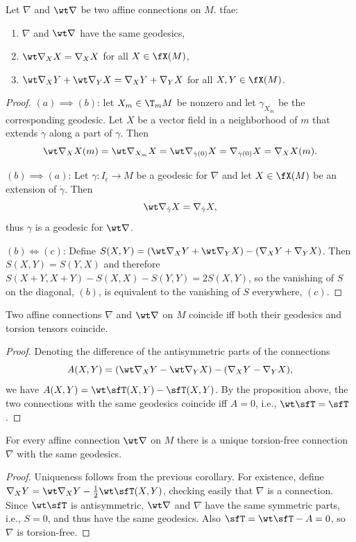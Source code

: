 \begin{prop}\label{prop geodesics coincide}
    Let $\nabla$ and $\wt\nabla$ be two affine connections on $M$. \gls{tfae}:
    \begin{enumerate}[label=(\alph*)]
        \item $\nabla$ and $\wt\nabla$ have the same geodesics,
        \item $\wt\nabla_X X=\nabla_X X$ for all $X\in\fX(M)$,
        \item $\wt\nabla_X Y+\wt\nabla_Y X=\nabla_X Y+\nabla_Y X$ for all $X,Y\in\fX(M)$.
    \end{enumerate}
\end{prop}
\begin{proof}
    $(a)\implies(b)$: let $X_m\in \T_mM$ be nonzero and let $\gamma_{X_m}$ be the corresponding geodesic. Let $X$ be a vector field in a neighborhood of $m$ that extends $\dot\gamma$ along a part of $\gamma$. Then 
    \[\wt\nabla_{X} X(m)=\wt\nabla_{X_m} X=\wt\nabla_{\dot\gamma(0)}X=\nabla_{\dot\gamma(0)}X=\nabla_X X(m).\]


    $(b)\implies(a)$: Let $\gamma:I_\epsilon\to M$ be a geodesic for $\nabla$ and let $X\in\fX(M)$ be an extension of $\dot\gamma$. Then 
    \[\wt\nabla_{\dot\gamma} X=\nabla_{\dot\gamma}X,\]
    thus $\gamma$ is a geodesic for $\wt\nabla$.

    $(b)\Leftrightarrow(c)$: Define $S(X,Y)=(\wt\nabla_X Y+\wt\nabla_Y X)-(\nabla_X Y+\nabla_Y X)$. Then $S(X,Y)=S(Y,X)$ and therefore $S(X+Y,X+Y)-S(X,X)-S(Y,Y)=2S(X,Y)$, so the vanishing of $S$ on the diagonal, $(b)$, is equivalent to the vanishing of $S$ everywhere, $(c)$.
\end{proof}
\begin{cor}
    Two affine connections $\nabla$ and $\wt\nabla$ on $M$ coincide iff both their geodesics and torsion tensors coincide.
\end{cor}
\begin{proof}
    Denoting the difference of the antisymmetric parts of the connections 
    \[A(X,Y)=(\wt\nabla_X Y-\wt\nabla_Y X)-(\nabla_X Y-\nabla_Y X),\]
    we have $A(X,Y)=\wt\sfT(X,Y)-\sfT(X,Y)$. By the proposition above, the two connections with the same geodesics coincide iff $A=0$, i.e., $\wt\sfT=\sfT$.
\end{proof}
\begin{cor}
    For every affine connection $\wt\nabla$ on $M$ there is a unique torsion-free connection $\nabla$ with the same geodesics.
\end{cor}
\begin{proof}
    Uniqueness follows from the previous corollary. For existence, define $\nabla_X Y=\wt\nabla_X Y-\frac12\wt\sfT(X,Y)$, checking easily that $\nabla$ is a connection. Since $\wt\sfT$ is antisymmetric, $\wt\nabla$ and $\nabla$ have the same symmetric parts, i.e., $S=0$, and thus have the same geodesics. Also $\sfT=\wt \sfT-A=0$, so $\nabla$ is torsion-free.
\end{proof}

